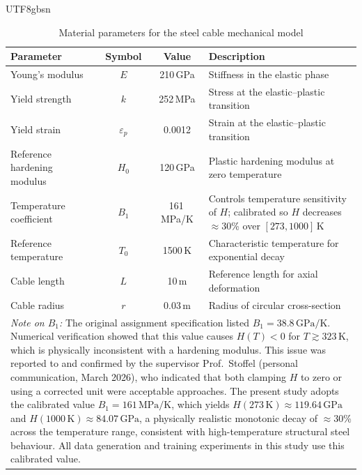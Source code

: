 \documentclass[a4paper,12pt]{report}
\begin{document}
\begin{CJK}{UTF8}{gbsn}
\begin{table}[H]
  \centering
  \caption{Material parameters for the steel cable mechanical model}
  \label{tab:material_params}
  \begin{tabularx}{\textwidth}{lccX}
    \toprule
    \textbf{Parameter} & \textbf{Symbol} & \textbf{Value} & \textbf{Description} \\
    \midrule
    Young's modulus & $E$ & 210\,GPa & Stiffness in the elastic phase \\
    Yield strength & $k$ & 252\,MPa & Stress at the elastic--plastic transition \\
    Yield strain & $\varepsilon_p$ & 0.0012 & Strain at the elastic--plastic transition \\
    Reference hardening modulus & $H_0$ & 120\,GPa & Plastic hardening modulus at zero temperature \\
    Temperature coefficient & $B_1$ & 161\,MPa/K & Controls temperature sensitivity of $H$; calibrated so $H$ decreases $\approx$30\% over $[273,1000]$\,K \\
    Reference temperature & $T_0$ & 1500\,K & Characteristic temperature for exponential decay \\
    Cable length & $L$ & 10\,m & Reference length for axial deformation \\
    Cable radius & $r$ & 0.03\,m & Radius of circular cross-section \\
    \bottomrule
    \multicolumn{4}{p{\dimexpr\linewidth-2\tabcolsep\relax}}{%
      \footnotesize \textit{Note on $B_1$:} The original assignment specification listed
      $B_1 = 38.8\,\text{GPa/K}$. Numerical verification showed that this value causes
      $H(T) < 0$ for $T \gtrsim 323\,\text{K}$, which is physically inconsistent with a
      hardening modulus. This issue was reported to and confirmed by the supervisor
      Prof.\ Stoffel (personal communication, March 2026), who indicated that both
      clamping $H$ to zero or using a corrected unit were acceptable approaches.
      The present study adopts the calibrated value $B_1 = 161\,\text{MPa/K}$, which
      yields $H(273\,\text{K}) \approx 119.64\,\text{GPa}$ and
      $H(1000\,\text{K}) \approx 84.07\,\text{GPa}$, a physically realistic monotonic
      decay of $\approx 30$\% across the temperature range, consistent with high-temperature
      structural steel behaviour.  All data generation and training experiments in this
      study use this calibrated value.} \\
  \end{tabularx}
\end{table}


\end{CJK}
\end{document}
